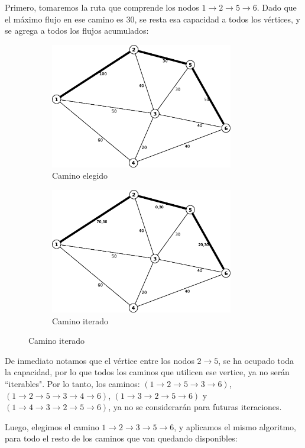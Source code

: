 \documentclass[12pt,letterpaper]{article}
\begin{document}
Primero, tomaremos la ruta que comprende los nodos $1\to2\to5\to6$. Dado que el máximo flujo en ese camino es $30$, se resta esa capacidad a todos los vértices, y se agrega a todos los flujos acumulados:

\begin{figure}[htbp]
        \centering
        \begin{subfigure}[htbp]{8cm}
                \centering
                \includegraphics[width=8cm]{./it0.png}
                \caption{Camino elegido}
        \end{subfigure}
        \begin{subfigure}[htbp]{8cm}
                \centering
                \includegraphics[width=8cm]{./it1.png}
                \caption{Camino iterado}
        \end{subfigure}
\end{figure}

De inmediato notamos que el vértice entre los nodos $2\to5$, se ha ocupado toda la capacidad, por lo que todos los caminos que utilicen ese vertice, ya no serán ``iterables". Por lo tanto, los caminos: $(1\to2\to5\to3\to6)$, $(1\to2\to5\to3\to4\to6)$, $(1\to3\to2\to5\to6)$ y $(1\to4\to3\to2\to5\to6)$, ya no se considerarán para futuras iteraciones.

Luego, elegimos el camino $1\to2\to3\to5\to6$, y aplicamos el mismo algoritmo, para todo el resto de los caminos que van quedando disponibles:
\end{document}
